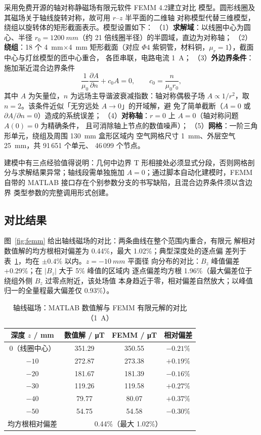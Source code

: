 \documentclass[zihao=-4,a4paper]{ctexart}
\numberwithin{figure}{section}
\numberwithin{table}{section}
\numberwithin{equation}{section}
\begin{document}
采用免费开源的轴对称静磁场有限元软件 FEMM 4.2\cite{meeker2019}建立对比
模型。圆形线圈及其磁场关于轴线旋转对称，故可用 $r$--$z$ 半平面的二维轴
对称模型代替三维模型，绕组以旋转体的矩形截面表示。模型设置如下：
（1）\textbf{求解域}：以线圈中心为圆心、半径 $r_0=\SI{1200}{mm}$（约 21
倍线圈半径）的半圆域，直边为对称轴；
（2）\textbf{绕组}：18 个 \SI{4}{mm}$\times$\SI{4}{mm} 矩形截面（对应
$\Phi 4$ 紫铜管，材料铜，$\mu_r=1$），截面中心与灯丝模型的匝中心重合，
各匝串联，电路电流 \SI{1}{A}；
（3）\textbf{外边界条件}：施加渐近混合边界条件
\begin{equation}
  \frac{1}{\mu_0}\frac{\partial A}{\partial n} + c_0 A = 0,
  \qquad c_0 = \frac{n}{\mu_0 r_0},
  \label{eq:asym}
\end{equation}
其中 $A$ 为矢量位，$n$ 为远场主导谐波衰减指数：轴对称偶极子场
$A\propto 1/r^2$，取 $n=2$。该条件近似「无穷远处 $A\to 0$」的开域解，避
免了简单截断（$A=0$ 或 $\partial A/\partial n=0$）造成的系统误差；
（4）\textbf{对称轴}：$r=0$ 上 $A=0$（轴对称问题 $A(0)=0$ 为精确条件，
且可消除轴上节点的数值噪声）；
（5）\textbf{网格}：一阶三角形单元，绕组及周围 \SI{130}{mm} 盒形区域内
空气网格尺寸 \SI{1}{mm}、外层空气 \SI{25}{mm}，共 91\,651 个单元、
46\,099 个节点。

建模中有三点经验值得说明：几何中边界 T 形相接处必须显式分段，否则网格剖
分与求解结果异常；轴线段需单独施加 $A=0$；通过脚本自动化建模时，FEMM
自带的 MATLAB 接口存在个别参数分支的书写缺陷，且混合边界条件须以含边界
类型参数的完整调用形式创建。

\subsection{对比结果}

图~\ref{fig:femm} 给出轴线磁场的对比：两条曲线在整个范围内重合，有限元
解相对数值解的均方根相对偏差为 0.44\%，最大 1.02\%；典型深度处的逐点偏
差列于表~\ref{tab:femm}，均在 $\pm 0.4\%$ 以内。$z=\SI{-10}{mm}$ 平面径
向分布的对比：$B_z$ 峰值偏差 +0.29\%；在 $|B_z|$ 大于 5\% 峰值的区域内
逐点偏差均方根 1.96\%（最大偏差位于绕组外侧 $B_z$ 过零点附近，该处场值
本身趋近于零，相对偏差自然放大；以峰值归一的全量程最大偏差仅 0.93\%）。

\begin{table}[htbp]
  \centering
  \caption{轴线磁场：MATLAB 数值解与 FEMM 有限元解的对比（\SI{1}{A}）}
  \label{tab:femm}
  \begin{tabular}{cccc}
    \toprule
    深度 $z$ / mm & 数值解 / \si{\micro T} & FEMM / \si{\micro T} & 相对偏差 \\
    \midrule
    0（线圈中心） & 351.29 & 350.55 & $-0.21\%$ \\
    $-10$ & 272.87 & 273.38 & $+0.19\%$ \\
    $-20$ & 181.67 & 181.39 & $-0.16\%$ \\
    $-30$ & 119.26 & 119.58 & $+0.27\%$ \\
    $-40$ & 79.77  & 80.07  & $+0.37\%$ \\
    $-50$ & 54.75  & 54.58  & $-0.30\%$ \\
    \midrule
    均方根相对偏差 & \multicolumn{3}{c}{0.44\%（最大 1.02\%）} \\
    \bottomrule
  \end{tabular}
\end{table}
\end{document}
